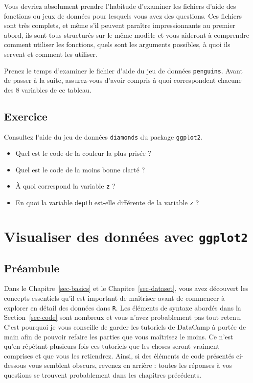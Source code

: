 \documentclass[
  a4paper,
  DIV=11,
  numbers=noendperiod,
  oneside]{scrreprt}
\providecommand{\tightlist}{%
  \setlength{\itemsep}{0pt}\setlength{\parskip}{0pt}}\usepackage{longtable,booktabs,array}
\begin{document}
Vous devriez absolument prendre l'habitude d'examiner les fichiers
d'aide des fonctions ou jeux de données pour lesquels vous avez des
questions. Ces fichiers sont très complets, et même s'il peuvent
paraître impressionnants au premier abord, ils sont tous structurés sur
le même modèle et vous aideront à comprendre comment utiliser les
fonctions, quels sont les arguments possibles, à quoi ils servent et
comment les utiliser.

Prenez le temps d'examiner le fichier d'aide du jeu de données
\texttt{penguins}. Avant de passer à la suite, assurez-vous d'avoir
compris à quoi correspondent chacune des 8 variables de ce tableau.

\section{Exercice}\label{sec-exo-2}

Consultez l'aide du jeu de données \texttt{diamonds} du package
\texttt{ggplot2}.

\begin{itemize}
\tightlist
\item
  Quel est le code de la couleur la plus prisée ?
\item
  Quel est le code de la moins bonne clarté ?
\item
  À quoi correspond la variable \texttt{z} ?
\item
  En quoi la variable \texttt{depth} est-elle différente de la variable
  \texttt{z} ?
\end{itemize}


\chapter{\texorpdfstring{Visualiser des données avec
\texttt{ggplot2}}{Visualiser des données avec ggplot2}}\label{sec-viz}

\section{Préambule}\label{pruxe9ambule-2}

Dans le Chapitre~\ref{sec-basics} et le Chapitre~\ref{sec-dataset}, vous
avez découvert les concepts essentiels qu'il est important de maîtriser
avant de commencer à explorer en détail des données dans \texttt{R}. Les
éléments de syntaxe abordés dans la Section~\ref{sec-code} sont nombreux
et vous n'avez probablement pas tout retenu. C'est pourquoi je vous
conseille de garder les tutoriels de DataCamp à portée de main afin de
pouvoir refaire les parties que vous maîtrisez le moins. Ce n'est qu'en
répétant plusieurs fois ces tutoriels que les choses seront vraiment
comprises et que vous les retiendrez. Ainsi, si des éléments de code
présentés ci-dessous vous semblent obscurs, revenez en arrière : toutes
les réponses à vos questions se trouvent probablement dans les chapitres
précédents.
\end{document}
